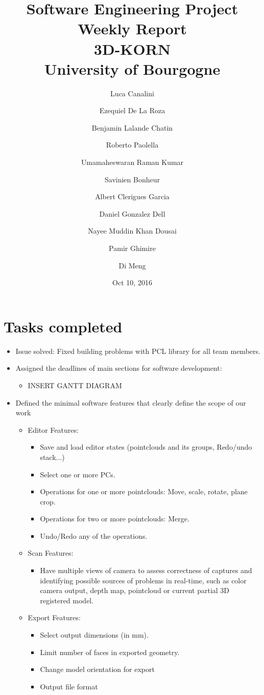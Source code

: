 \documentclass[11pt]{article} %
\title{Software Engineering Project Weekly Report\\ \textbf{3D-KORN} \\ University of Bourgogne}
\author{Luca Canalini \and Ezequiel De La Roza \and Benjamin Lalande Chatin \and Roberto Paolella \and Umamaheswaran Raman Kumar \and Savinien Bonheur \and Albert Clerigues Garcia \and Daniel Gonzalez Dell \and Nayee Muddin Khan Dousai \and Pamir Ghimire \and Di Meng
}
\date{Oct 10, 2016} %
\begin{document}
\maketitle
\newpage

\section{Tasks completed}
\begin{itemize}
	\item Issue solved: Fixed building problems	with PCL library for all team members.
	
	\item Assigned the deadlines of main sections for software development:
	\begin{itemize}
		\item INSERT GANTT DIAGRAM
	\end{itemize}

	\item Defined the minimal software features that clearly define the scope of our work
	\begin{itemize}
		\item Editor Features:
		\begin{itemize}
			\item Save and load editor states (pointclouds and its groups, Redo/undo stack...)
			\item Select one or more PCs.
			\item Operations for one or more pointclouds: Move, scale, rotate, plane crop.
			\item Operations for two or more pointclouds: Merge.
			\item Undo/Redo any of the operations.
		\end{itemize}
		
		\item Scan Features:
		\begin{itemize}
			\item Have multiple views of camera to assess correctness of captures and identifying possible sources of problems in real-time, such as color camera output, depth map, pointcloud or current partial 3D registered model.
		\end{itemize}
		
		\item Export Features:
		\begin{itemize}
			\item Select output dimensions (in mm).
			\item Limit number of faces in exported geometry.
			\item Change model orientation for export
			\item Output file format
		\end{itemize}	
	\end{itemize}


\end{itemize}
\end{document}
